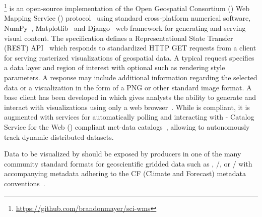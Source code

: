 \section{\sciwms{}}
\label{sec:sciwms}
\Sciwms{}\footnote{\url{https://github.com/brandonmayer/sci-wms}} is
an open-source \python{} implementation of the Open Geospatial
Consortium (\ogc{}) Web Mapping Service (\wms{}) protocol~\cite{wms14}
using standard cross-platform numerical software,
NumPy~\cite{numpy11}, Matplotlib~\cite{hunter07} and
Django~\cite{django} web framework for generating and serving visual
content. The \ogcwms{} specification defines a Representational State
Transfer (REST) API~\cite{Fielding02} which responds to standardized
HTTP GET requests from a \wms{} client for serving rasterized
visualizations of geospatial data. A typical \wms{} request specifies
a data layer and region of interest with optional \metadata such as
rendering style parameters. A \wms{} response may include additional
information regarding the selected data or a visualization in the form
of a PNG or other standard image format. A base \wms{} client has been
developed in \javascript{} which gives analysts the ability to
generate and interact with visualizations using only a web
browser~\cite{comtui}.
While \sciwms{} is \ogcwms{} compliant, it is augmented with
services for automatically polling and interacting with \ogc{} -
Catalog Service for the Web (\csw{}) compliant met-data
catalogs~\cite{csw14}, allowing \sciwms{} to autonomously track
dynamic distributed datasets.

Data to be visualized by \sciwms{} should be exposed by producers in
one of the many community standard formats for geoscientific gridded
data such as \netcdf{}, \hdf{}/, or \grib{}/ with
accompanying metadata adhering to the CF (Climate and Forecast)
metadata conventions~\cite{cf}.

